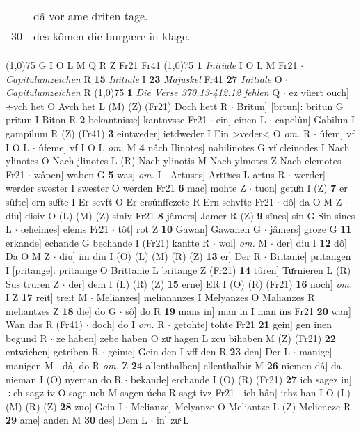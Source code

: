 \documentclass[8pt,a4paper,notitlepage]{article}
\begin{document}
\begin{table}[ht]
\begin{minipage}[t]{0.5\linewidth}
\begin{tabular}{rl}
 & dâ vor ame driten tage.\\ 
30 & des kômen die burgære in klage.\\ 
\end{tabular}
\scriptsize
\line(1,0){75} \newline
G I O L M Q R Z Fr21 Fr41 \newline
\line(1,0){75} \newline
\textbf{1} \textit{Initiale} I O L M Fr21   $\cdot$ \textit{Capitulumzeichen} R  \textbf{15} \textit{Initiale} I  \textbf{23} \textit{Majuskel} Fr41  \textbf{27} \textit{Initiale} O   $\cdot$ \textit{Capitulumzeichen} R  \newline
\line(1,0){75} \newline
\textbf{1} \textit{Die Verse 370.13-412.12 fehlen} Q   $\cdot$ ez vüert ouch] ÷vch het O Avch het L (M) (Z) (Fr21) Doch hett R  $\cdot$ Britun] [brtun]: britun G pritun I Biton R \textbf{2} bekantnisse] kantnvsse Fr21  $\cdot$ ein] einen L  $\cdot$ capelûn] Gabilun I gampilum R (Z) (Fr41) \textbf{3} eintweder] ietdweder I Ein >veder< O \textit{om.} R  $\cdot$ ûfem] vf I O L  $\cdot$ ûfeme] vf I O L \textit{om.} M \textbf{4} nâch Ilinotes] nahilinotes G vf cleinodes I Nach ylinotes O Nach jlinotes L (R) Nach ylinotis M Nach ylmotes Z Nach elemotes Fr21  $\cdot$ wâpen] waben G \textbf{5} was] \textit{om.} I  $\cdot$ Artuses] Artuͯses L artus R  $\cdot$ werder] werder swester I swester O werden Fr21 \textbf{6} mac] mohte Z  $\cdot$ tuon] getuͦn I (Z) \textbf{7} er sûfte] ern suͤfte I Er sevft O Er ersúnffczete R Ern schvfte Fr21  $\cdot$ dô] da O M Z  $\cdot$ diu] disiv O (L) (M) (Z) siniv Fr21 \textbf{8} jâmers] Jamer R (Z) \textbf{9} sînes] sin G Sin sines L  $\cdot$ œheimes] elems Fr21  $\cdot$ tôt] rot Z \textbf{10} Gawan] Gawanen G  $\cdot$ jâmers] groze G \textbf{11} erkande] echande G bechande I (Fr21) kantte R  $\cdot$ wol] \textit{om.} M  $\cdot$ der] diu I \textbf{12} dô] Da O M Z  $\cdot$ diu] im diu I (O) (L) (M) (R) (Z) \textbf{13} er] Der R  $\cdot$ Britanie] pritangen I [pritange]: pritanige O Brittanie L britange Z (Fr21) \textbf{14} tûren] Tuͯrnieren L (R) Sus truren Z  $\cdot$ der] dem I (L) (R) (Z) \textbf{15} erne] ER I (O) (R) (Fr21) \textbf{16} noch] \textit{om.} I Z \textbf{17} reit] treit M  $\cdot$ Melianzes] meliananzes I Melyanzes O Malianzes R meliantzes Z \textbf{18} die] do G  $\cdot$ sô] do R \textbf{19} mans in] man in I man ins Fr21 \textbf{20} wan] Wan das R (Fr41)  $\cdot$ doch] do I \textit{om.} R  $\cdot$ getohte] tohte Fr21 \textbf{21} gein] gen inen begund R  $\cdot$ ze haben] zebe haben O zuͯ hagen L zcu bihaben M (Z) (Fr21) \textbf{22} entwichen] getriben R  $\cdot$ geime] Gein den I vff den R \textbf{23} den] Der L  $\cdot$ manige] manigen M  $\cdot$ dâ] do R \textit{om.} Z \textbf{24} allenthalben] ellenthalbir M \textbf{26} niemen dâ] da nieman I (O) nyeman do R  $\cdot$ bekande] erchande I (O) (R) (Fr21) \textbf{27} ich sagez iu] ÷ch sagz iv O sage uch M sagen úchs R sagt ivz Fr21  $\cdot$ ich hân] ichz han I O (L) (M) (R) (Z) \textbf{28} zuo] Gein I  $\cdot$ Melianze] Melyanze O Meliantze L (Z) Meliencze R \textbf{29} ame] anden M \textbf{30} des] Dem L  $\cdot$ in] zuͯ L \newline

\end{minipage}
\end{table}
\end{document}
